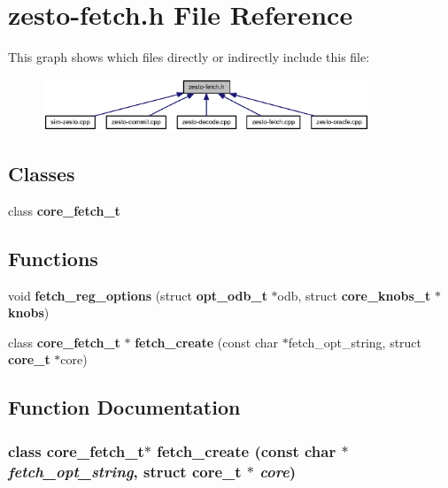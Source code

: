 \section{zesto-fetch.h File Reference}
\label{zesto-fetch_8h}


This graph shows which files directly or indirectly include this file:\nopagebreak
\begin{figure}[H]
\begin{center}
\leavevmode
\includegraphics[width=276pt]{zesto-fetch_8h__dep__incl}
\end{center}
\end{figure}
\subsection*{Classes}
\begin{CompactItemize}
\item 
class {\bf core\_\-fetch\_\-t}
\end{CompactItemize}
\subsection*{Functions}
\begin{CompactItemize}
\item 
void {\bf fetch\_\-reg\_\-options} (struct {\bf opt\_\-odb\_\-t} $\ast$odb, struct {\bf core\_\-knobs\_\-t} $\ast${\bf knobs})
\item 
class {\bf core\_\-fetch\_\-t} $\ast$ {\bf fetch\_\-create} (const char $\ast$fetch\_\-opt\_\-string, struct {\bf core\_\-t} $\ast$core)
\end{CompactItemize}


\subsection{Function Documentation}
\subsubsection[{fetch\_\-create}]{\setlength{\rightskip}{0pt plus 5cm}class {\bf core\_\-fetch\_\-t}$\ast$ fetch\_\-create (const char $\ast$ {\em fetch\_\-opt\_\-string}, \/  struct {\bf core\_\-t} $\ast$ {\em core})}\label{zesto-fetch_8h_9dabdc921dc59e593201a9d42ee1fc63}




